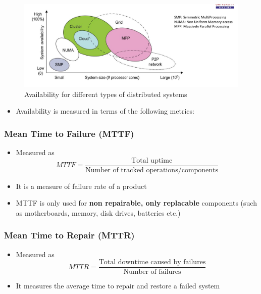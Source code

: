 \documentclass{article}
\begin{document}
\begin{figure}[!h]
    \centering
    \includegraphics[scale=0.3]{pic1.png}
    \caption{Availability for different types of distributed systems}
    \label{fig:my_label_69696969}
\end{figure}
\begin{itemize}
    \item Availability is measured in terms of the following metrics:
\end{itemize}

\subsubsection{Mean Time to Failure (MTTF)}
\begin{itemize}
    \item Measured as
    \begin{equation}
        MTTF = \frac{\text{Total uptime}}{\text{Number of tracked operations/components}}
    \end{equation}
    
    \item It is a measure of failure rate of a product
    
    \item MTTF is only used for \textbf{non repairable, only replacable} components (such as motherboards, memory, disk drives, batteries etc.)
\end{itemize}

\subsubsection{Mean Time to Repair (MTTR)}
\begin{itemize}
    \item Measured as
    \begin{equation}
        MTTR = \frac{\text{Total downtime caused by failures}}{\text{Number of failures}}
    \end{equation}
    
    \item It measures the average time to repair and restore a failed system
\end{itemize}
\end{document}
